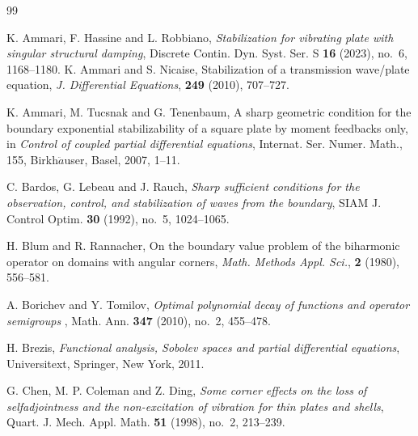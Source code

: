 \documentclass[twoside]{article}
\theoremstyle{noparens}
\theoremstyle{definition}
\numberwithin{equation}{section}
\numberwithin{figure}{section}
\begin{document}
\begin{thebibliography}{99}

\setlength{\itemsep}{0ex}


{\footnotesize

 K. Ammari, F. Hassine and L. Robbiano, {\it Stabilization for vibrating plate with singular structural damping}, Discrete Contin. Dyn. Syst. Ser. S {\bf 16} (2023), no.~6, 1168--1180.
 K. Ammari and S. Nicaise, Stabilization of a transmission wave/plate equation, {\it J. Differential Equations}, {\bf 249} (2010), 707--727.



 K. Ammari, M. Tucsnak and G. Tenenbaum, A sharp geometric condition for the boundary exponential stabilizability of a square plate by moment feedbacks only, in {\it Control of coupled partial differential equations}, Internat. Ser. Numer. Math., 155, Birkh$\ddot{a}$user, Basel, 2007, 1--11.

 C.  Bardos, G. Lebeau and J. Rauch, {\it Sharp sufficient conditions for the observation, control, and stabilization of waves from the boundary}, SIAM J. Control Optim. {\bf 30} (1992), no.~5, 1024--1065.

 H. Blum and R. Rannacher, On the boundary value problem of the biharmonic operator on domains with angular corners, {\it Math. Methods Appl. Sci.}, {\bf 2} (1980), 556--581.

 A. Borichev and Y. Tomilov,  {\it Optimal polynomial decay of functions and operator semigroups} , Math. Ann. {\bf 347} (2010), no.~2, 455--478.


 H. Brezis, {\it Functional analysis, Sobolev spaces and partial differential equations}, Universitext, Springer, New York, 2011.


 G. Chen, M. P. Coleman and Z. Ding, {\it Some corner effects on the loss of selfadjointness and the non-excitation of vibration for thin plates and shells}, Quart. J. Mech. Appl. Math. {\bf 51} (1998), no.~2, 213--239.


}
\end{thebibliography}
\end{document}
